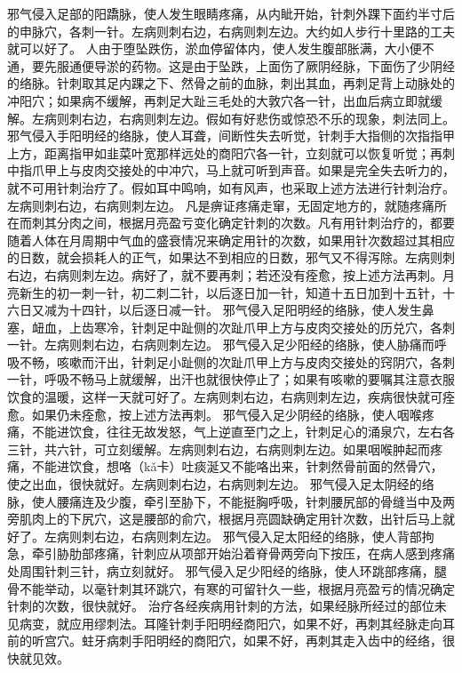 \documentclass[12pt,UTF8]{ctexbook}
\begin{document}
邪气侵入足部的阳蹻脉，使人发生眼睛疼痛，从内眦开始，针刺外踝下面约半寸后的申脉穴，各刺一针。左病则刺右边，右病则刺左边。大约如人步行十里路的工夫就可以好了。
人由于堕坠跌伤，淤血停留体内，使人发生腹部胀满，大小便不通，要先服通便导淤的药物。这是由于坠跌，上面伤了厥阴经脉，下面伤了少阴经的络脉。针刺取其足内踝之下、然骨之前的血脉，刺出其血，再刺足背上动脉处的冲阳穴；如果病不缓解，再刺足大趾三毛处的大敦穴各一针，出血后病立即就缓解。左病则刺右边，右病则刺左边。假如有好悲伤或惊恐不乐的现象，刺法同上。
邪气侵入手阳明经的络脉，使人耳聋，间断性失去听觉，针刺手大指侧的次指指甲上方，距离指甲如韭菜叶宽那样远处的商阳穴各一针，立刻就可以恢复听觉；再刺中指爪甲上与皮肉交接处的中冲穴，马上就可听到声音。如果是完全失去听力的，就不可用针刺治疗了。假如耳中鸣响，如有风声，也采取上述方法进行针刺治疗。左病则刺右边，右病则刺左边。
凡是痹证疼痛走窜，无固定地方的，就随疼痛所在而刺其分肉之间，根据月亮盈亏变化确定针刺的次数。凡有用针刺治疗的，都要随着人体在月周期中气血的盛衰情况来确定用针的次数，如果用针次数超过其相应的日数，就会损耗人的正气，如果达不到相应的日数，邪气又不得泻除。左病则刺右边，右病则刺左边。病好了，就不要再刺；若还没有痊愈，按上述方法再刺。月亮新生的初一刺一针，初二刺二针，以后逐日加一针，知道十五日加到十五针，十六日又减为十四针，以后逐日减一针。
邪气侵入足阳明经的络脉，使人发生鼻塞，衄血，上齿寒冷，针刺足中趾侧的次趾爪甲上方与皮肉交接处的历兑穴，各刺一针。左病则刺右边，右病则刺左边。
邪气侵入足少阳经的络脉，使人胁痛而呼吸不畅，咳嗽而汗出，针刺足小趾侧的次趾爪甲上方与皮肉交接处的窍阴穴，各刺一针，呼吸不畅马上就缓解，出汗也就很快停止了；如果有咳嗽的要嘱其注意衣服饮食的温暖，这样一天就可好了。左病则刺右边，右病则刺左边，疾病很快就可痊愈。如果仍未痊愈，按上述方法再刺。
邪气侵入足少阴经的络脉，使人咽喉疼痛，不能进饮食，往往无故发怒，气上逆直至门之上，针刺足心的涌泉穴，左右各三针，共六针，可立刻缓解。左病则刺右边，右病则刺左边。如果咽喉肿起而疼痛，不能进饮食，想咯（kǎ卡）吐痰涎又不能咯出来，针刺然骨前面的然骨穴，使之出血，很快就好。左病则刺右边，右病则刺左边。
邪气侵入足太阴经的络脉，使人腰痛连及少腹，牵引至胁下，不能挺胸呼吸，针刺腰尻部的骨缝当中及两旁肌肉上的下尻穴，这是腰部的俞穴，根据月亮圆缺确定用针次数，出针后马上就好了。左病则刺右边，右病则刺左边。
邪气侵入足太阳经的络脉，使人背部拘急，牵引胁肋部疼痛，针刺应从项部开始沿着脊骨两旁向下按压，在病人感到疼痛处周围针刺三针，病立刻就好。
邪气侵入足少阳经的络脉，使人环跳部疼痛，腿骨不能举动，以毫针刺其环跳穴，有寒的可留针久一些，根据月亮盈亏的情况确定针刺的次数，很快就好。
治疗各经疾病用针刺的方法，如果经脉所经过的部位未见病变，就应用缪刺法。耳隆针刺手阳明经商阳穴，如果不好，再刺其经脉走向耳前的听宫穴。蛀牙病刺手阳明经的商阳穴，如果不好，再刺其走入齿中的经络，很快就见效。
\end{document}
